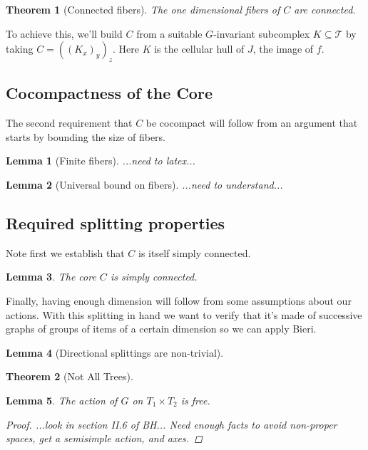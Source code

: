 \documentclass{article}
\newcommand{\sxyz}{((K_x)_y)_z}
\theoremstyle{mystyle}
\newtheorem{thm}{Theorem}[section]
\newtheorem{lem}{Lemma}[section]
\theoremstyle{remark}
\begin{document}
\begin{thm}
    [Connected fibers]
    The one dimensional fibers of \(C\) are connected.
\end{thm}


To achieve this, we'll build \(C\) from a suitable \(G\)-invariant subcomplex \(K \subseteq \mathscr{T} \) by taking \(C = \sxyz\).  Here \(K\) is the cellular hull of \(J\), the image of \(f\). 




\subsection{Cocompactness of the Core}
The second requirement that \(C\) be cocompact will follow from an argument that starts by bounding the size of fibers. 
 \begin{lem}
     [Finite fibers]
     ...need to latex...
 \end{lem}

 \begin{lem}
     [Universal bound on fibers]
     ...need to understand...
 \end{lem}


\subsection{Required splitting properties}
Note first we establish that \(C\) is itself simply connected.
\begin{lem}
    The core \(C\) is simply connected.
\end{lem}

Finally, having enough dimension will follow from some assumptions about our actions.
With this splitting in hand we want to verify that it's made of successive graphs of groups of items of a certain dimension so we can apply Bieri.

\begin{lem}
    [Directional splittings are non-trivial]
\end{lem}

\begin{thm}
    [Not All Trees]
\end{thm}

\begin{lem}
    The action of \(G\) on \(T_1 \times T_{2} \) is free.
    \begin{proof}
        ...look in section II.6 of BH... Need enough facts to avoid non-proper spaces, get a semisimple action, and axes.
    \end{proof}
\end{lem}
\end{document}
